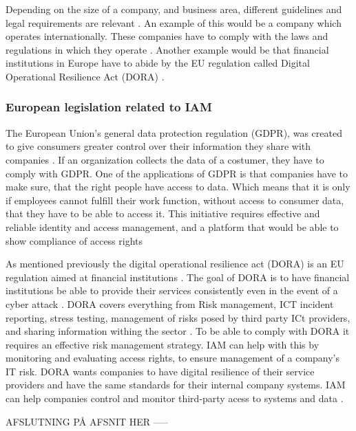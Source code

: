 Depending on the size of a company, and business area, different guidelines and legal requirements are relevant \cite{2024compliance?}. An example of this would be a company which operates internationally. These companies have to comply with the laws and regulations in which they operate \citep{2024compliance?}. Another example would be that financial institutions in Europe have to abide by the EU regulation called Digital Operational Resilience Act (DORA) \citep{Dora}.


\subsubsection{European legislation related to IAM}
The European Union's general data protection regulation (GDPR), was created to give consumers greater control over their information they share with companies \citep{IAM-gdpr:}. If an organization collects the data of a costumer, they have to comply with GDPR. One of the applications of GDPR is that companies have to make sure, that the right people have access to data. Which means that it is only if employees cannot fulfill their work function, without access to consumer data, that they have to be able to access it. This initiative requires effective and reliable identity and access management, and a platform that would be able to show compliance of access rights \citep{IAM-gdpr:}

As mentioned previously the digital operational resilience act (DORA) is an EU regulation aimed at financial institutions \citep{DoraIAM:}. The goal of DORA is to have financial institutions be able to provide their services consistently even in the event of a cyber attack \citep{DoraIAM:}. DORA covers everything from Risk management, ICT incident reporting, stress testing, management of risks posed by third party ICt providers, and sharing information withing the sector \citep{Dora}. To be able to comply with DORA it requires an effective risk management strategy. IAM can help with this by monitoring and evaluating access rights, to ensure management of a company's IT risk. DORA wants companies to have digital resilience of their service providers and have the same standards for their internal company systems. IAM can help companies control and monitor third-party acess to systems and data \citep{DoraIAM:}.




AFSLUTNING PÅ AFSNIT HER -----
